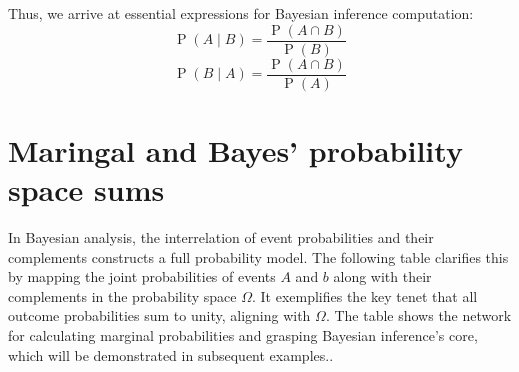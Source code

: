 \documentclass[
  12 pt,
  a4paper,
]{book}
\numberwithin{equation}{section}
\theoremstyle{plain}      %
\theoremstyle{definition} %
\theoremstyle{remark}     %
\theoremstyle{note}         %
\begin{document}
Thus, we arrive at essential expressions for Bayesian inference
computation: \[
\operatorname{P}(A\! \mid\! B)=\frac{\operatorname{P}(A \cap B)}{\operatorname{P}(B)}
\] \[
\operatorname{P}(B\! \mid\! A)=\frac{\operatorname{P}(A \cap B)}{\operatorname{P}(A)}
\]

\newpage

\hypertarget{maringal-and-bayes-probability-space-sums}{%
\section{Maringal and Bayes' probability space
sums}\label{maringal-and-bayes-probability-space-sums}}

In Bayesian analysis, the interrelation of event probabilities and their
complements constructs a full probability model. The following table
clarifies this by mapping the joint probabilities of events \(A\) and
\(b\) along with their complements in the probability space \(\Omega\).
It exemplifies the key tenet that all outcome probabilities sum to
unity, aligning with \(\Omega\). The table shows the network for
calculating marginal probabilities and grasping Bayesian inference's
core, which will be demonstrated in subsequent examples..
\end{document}
